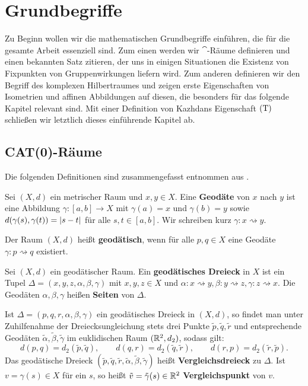 \chapter{Grundbegriffe}
\label{cha:property_T}
	Zu Beginn wollen wir die mathematischen Grundbegriffe einführen, die für die gesamte Arbeit essenziell sind. Zum einen werden wir $\cat$-Räume definieren und einen bekannten Satz zitieren, der uns in einigen Situationen die Existenz von Fixpunkten von Gruppenwirkungen liefern wird. Zum anderen definieren wir den Begriff des komplexen Hilbertraumes und zeigen erste Eigenschaften von Isometrien und affinen Abbildungen auf diesen, die besonders für das folgende Kapitel relevant sind. Mit einer Definition von Kazhdans Eigenschaft $\operatorname{(T)}$ schließen wir letztlich dieses einführende Kapitel ab.

\section{CAT(0)-Räume}	
\label{sec:cat0}	
	Die folgenden Definitionen sind zusammengefasst entnommen aus \cite[Kap. 1]{Schwer}.
	
\begin{definition}
	Sei $(X,d)$ ein metrischer Raum und $x,y \in X$. Eine \textbf{Geodäte} von $x$ nach $y$ ist eine Abbildung $\gamma\colon [a,b] \rightarrow X$ mit $\gamma(a)=x$ und $\gamma(b) = y$ sowie $d(\gamma(s),\gamma(t)) = \lvert s-t\rvert$ für alle $s,t \in [a,b]$. Wir schreiben kurz $\gamma\colon x \rightsquigarrow y$.
	
	Der Raum $(X,d)$ heißt \textbf{geodätisch}, wenn für alle $p,q \in X$ eine Geodäte $\gamma \colon p \rightsquigarrow q$ existiert.
\end{definition}

\begin{definition}
	Sei $(X,d)$ ein geodätischer Raum. Ein \textbf{geodätisches Dreieck} in $X$ ist ein Tupel $\Delta = (x,y,z,\alpha,\beta,\gamma)$ mit $x,y,z \in X$ und $\alpha\colon x \rightsquigarrow y, \beta\colon y \rightsquigarrow z, \gamma\colon z \rightsquigarrow x$. Die Geodäten $\alpha, \beta, \gamma$ heißen \textbf{Seiten} von $\Delta$.
\end{definition}

Ist $\Delta = (p,q,r,\alpha,\beta,\gamma)$ ein geodätisches Dreieck in $(X,d)$, so findet man unter Zuhilfenahme der Dreiecksungleichung stets drei Punkte $\tilde{p},\tilde{q},\tilde{r}$ und entsprechende Geodäten $\tilde{\alpha}, \tilde{\beta}, \tilde{\gamma}$ im euklidischen Raum $(\mathbb{R}^2,d_2)$, sodass gilt:
\[
	d(p,q) = d_2(\tilde{p},\tilde{q}), \qquad d(q,r) = d_2(\tilde{q},\tilde{r}), \qquad d(r,p) = d_2(\tilde{r},\tilde p).
\]
Das geodätische Dreieck $(\tilde{p},\tilde{q},\tilde{r}, \tilde{\alpha}, \tilde{\beta}, \tilde{\gamma})$ heißt \textbf{Vergleichsdreieck} zu $\Delta$. Ist $v = \gamma(s) \in X$ für ein $s$, so heißt $\tilde{v} = \tilde{\gamma}(s) \in \mathbb{R}^2$ \textbf{Vergleichspunkt} von $v$.

